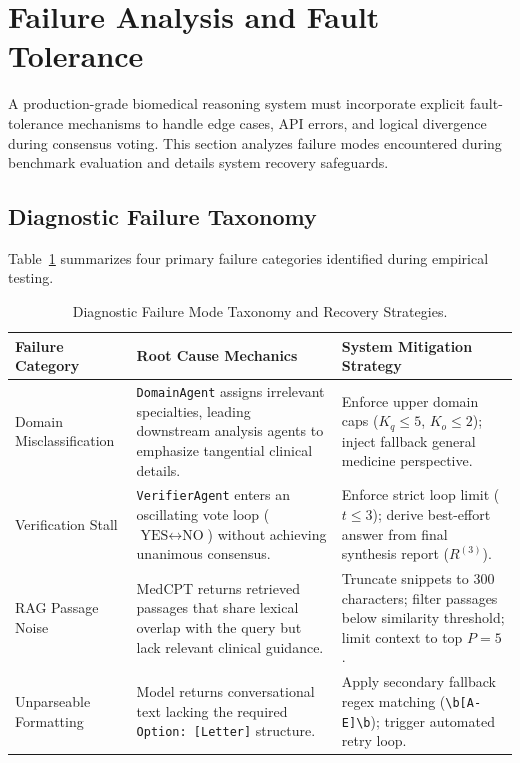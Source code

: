 \section{Failure Analysis and Fault Tolerance}
\label{sec:failure_analysis}

A production-grade biomedical reasoning system must incorporate explicit fault-tolerance mechanisms to handle edge cases, API errors, and logical divergence during consensus voting. This section analyzes failure modes encountered during benchmark evaluation and details system recovery safeguards.

\subsection{Diagnostic Failure Taxonomy}

Table~\ref{tab:failure_taxonomy} summarizes four primary failure categories identified during empirical testing.

\begin{table}[htbp]
\centering
\caption{Diagnostic Failure Mode Taxonomy and Recovery Strategies.}
\label{tab:failure_taxonomy}
\small
\begin{tabularx}{\textwidth}{l X X}
\toprule
\textbf{Failure Category} & \textbf{Root Cause Mechanics} & \textbf{System Mitigation Strategy} \\
\midrule
Domain Misclassification & \texttt{DomainAgent} assigns irrelevant specialties, leading downstream analysis agents to emphasize tangential clinical details. & Enforce upper domain caps ($K_q \le 5$, $K_o \le 2$); inject fallback general medicine perspective. \\
Verification Stall & \texttt{VerifierAgent} enters an oscillating vote loop ($\text{YES} \leftrightarrow \text{NO}$) without achieving unanimous consensus. & Enforce strict loop limit ($t \le 3$); derive best-effort answer from final synthesis report ($R^{(3)}$). \\
RAG Passage Noise & MedCPT returns retrieved passages that share lexical overlap with the query but lack relevant clinical guidance. & Truncate snippets to 300 characters; filter passages below similarity threshold; limit context to top $P=5$. \\
Unparseable Formatting & Model returns conversational text lacking the required \texttt{Option: [Letter]} structure. & Apply secondary fallback regex matching (\texttt{\textbackslash b[A-E]\textbackslash b}); trigger automated retry loop. \\
\bottomrule
\end{tabularx}
\end{table}

